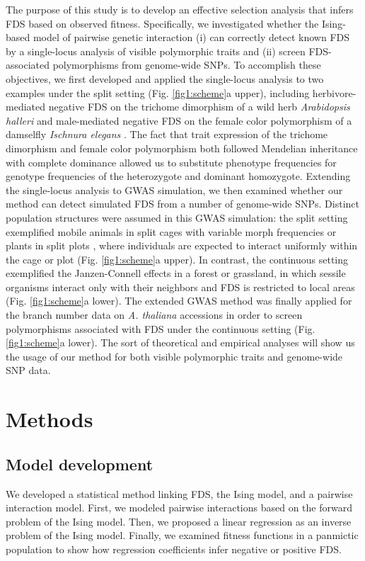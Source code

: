 \documentclass[12pt,]{article}
\begin{document}
The purpose of this study is to develop an effective selection analysis that infers FDS based on observed fitness. Specifically, we investigated whether the Ising-based model of pairwise genetic interaction (i) can correctly detect known FDS by a single-locus analysis of visible polymorphic traits and (ii) screen FDS-associated polymorphisms from genome-wide SNPs. To accomplish these objectives, we first developed and applied the single-locus analysis to two examples under the split setting (Fig. \ref{fig1:scheme}a upper), including herbivore-mediated negative FDS on the trichome dimorphism of a wild herb \textit{Arabidopsis halleri} \citep{sato2017herbivore} and male-mediated negative FDS on the female color polymorphism of a damselfly \textit{Ischnura elegans} \citep{takahashi2014evolution}. The fact that trait expression of the trichome dimorphism and female color polymorphism both followed Mendelian inheritance with complete dominance \citep{shimizu2002ecology,sanchez2005hybridization,kawagoe2011coexistence} allowed us to substitute phenotype frequencies for genotype frequencies of the heterozygote and dominant homozygote. Extending the single-locus analysis to GWAS simulation, we then examined whether our method can detect simulated FDS from a number of genome-wide SNPs. Distinct population structures were assumed in this GWAS simulation: the split setting exemplified mobile animals in split cages with variable morph frequencies \citep{takahashi2014evolution} or plants in split plots \citep{sato2017herbivore}, where individuals are expected to interact uniformly within the cage or plot (Fig. \ref{fig1:scheme}a upper). In contrast, the continuous setting exemplified the Janzen-Connell effects \citep{janzen1970herbivores, connell1971role} in a forest or grassland, in which sessile organisms interact only with their neighbors and FDS is restricted to local areas (Fig. \ref{fig1:scheme}a lower). The extended GWAS method was finally applied for the branch number data on \textit{A. thaliana} accessions in order to screen polymorphisms associated with FDS under the continuous setting (Fig. \ref{fig1:scheme}a lower). The sort of theoretical and empirical analyses will show us the usage of our method for both visible polymorphic traits and genome-wide SNP data.


\section{Methods}

\subsection{Model development}
We developed a statistical method linking FDS, the Ising model, and a pairwise interaction model. First, we modeled pairwise interactions based on the forward problem of the Ising model. Then, we proposed a linear regression as an inverse problem of the Ising model. Finally, we examined fitness functions in a panmictic population to show how regression coefficients infer negative or positive FDS.
\end{document}
